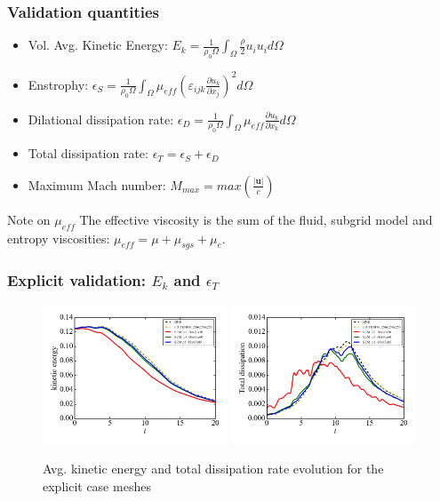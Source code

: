 \begin{frame}
    \frametitle{Validation quantities}
    \begin{itemize}
      \item Vol. Avg. Kinetic Energy: $E_k = \frac{1}{\rho_0 \Omega} \int_{\Omega} \frac{\rho}{2} u_i u_i d \Omega$
      \item Enstrophy: $\epsilon_S = \frac{1}{\rho_0 \Omega} \int_{\Omega} \mu_{eff} \left( \varepsilon_{ijk} \frac{\partial u_k}{\partial x_j} \right)^2 d \Omega$
      \item Dilational dissipation rate: $\epsilon_D = \frac{1}{\rho_0 \Omega} \int_{\Omega} \mu_{eff} \frac{\partial u_k}{\partial x_k} d \Omega$
      \item Total dissipation rate: $\epsilon_T = \epsilon_S + \epsilon_D$
      \item Maximum Mach number: $M_{max} = max( \frac{| \mathbf{u} |}{c})$
    \end{itemize}

	\begin{block}{Note on $\mu_{eff}$}
		The effective viscosity is the sum of the fluid, subgrid model and entropy viscosities: $\mu_{eff} = \mu + \mu_{sgs} + \mu_e$.
	\end{block}
\end{frame}

\begin{frame}
	\frametitle{Explicit validation: $E_k$ and $\epsilon_T$}
	\begin{figure}
		\centering
		\includegraphics[width=0.49\textwidth]{images/KE.png}
		\includegraphics[width=0.49\textwidth]{images/TD.png}
        \caption{Avg. kinetic energy and total dissipation rate evolution for the explicit case meshes}
	\end{figure}
\end{frame}


